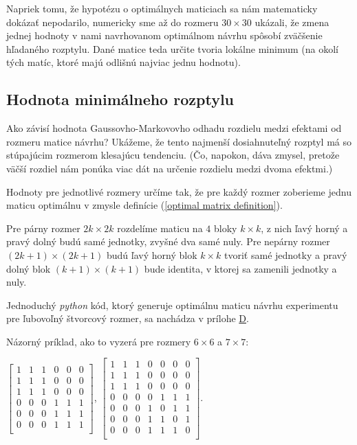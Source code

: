 Napriek tomu, že hypotézu o optimálnych maticiach sa nám matematicky dokázať nepodarilo, numericky sme až do rozmeru $30 \times 30$ ukázali,
že zmena jednej hodnoty v nami navrhovanom optimálnom návrhu spôsobí zväčšenie hľadaného rozptylu.
Dané matice teda určite tvoria lokálne minimum (na okolí tých matíc, ktoré majú odlišnú najviac jednu hodnotu).

\subsection{Hodnota minimálneho rozptylu}

Ako závisí hodnota Gaussovho-Markovovho odhadu rozdielu medzi efektami od rozmeru matice návrhu? 
Ukážeme, že tento najmenší dosiahnuteľný rozptyl má so stúpajúcim rozmerom klesajúcu tendenciu. 
(Čo, napokon, dáva zmysel, pretože väčší rozdiel nám ponúka viac dát na určenie rozdielu medzi dvoma efektmi.)

Hodnoty pre jednotlivé rozmery určíme tak, že pre každý rozmer zoberieme jednu maticu optimálnu 
v zmysle definície (\ref{optimal matrix definition}).

Pre párny rozmer $2k \times 2k$ rozdelíme maticu na $4$ bloky $k \times k$, 
z nich ľavý horný a pravý dolný budú samé jednotky, zvyšné dva samé nuly. 
Pre nepárny rozmer $(2k + 1) \times (2k + 1)$ budú ľavý horný blok $k \times k$ tvoriť samé jednotky 
a pravý dolný blok $(k + 1) \times (k + 1)$ bude identita, v ktorej sa zamenili jednotky a nuly.

Jednoduchý \emph{python} kód, ktorý generuje optimálnu maticu návrhu experimentu pre ľubovoľný štvorcový rozmer,
sa nachádza v prílohe \hyperref[appendix:d]{D}.

Názorný príklad, ako to vyzerá pre rozmery $6 \times 6$ a $7 \times 7$:

\begin{center}
$
\begin{bmatrix}
1 & 1 & 1 & 0 & 0 & 0 \\
1 & 1 & 1 & 0 & 0 & 0 \\
1 & 1 & 1 & 0 & 0 & 0 \\
0 & 0 & 0 & 1 & 1 & 1 \\
0 & 0 & 0 & 1 & 1 & 1 \\
0 & 0 & 0 & 1 & 1 & 1 \\
\end{bmatrix}
$,
$
\begin{bmatrix}
1 & 1 & 1 & 0 & 0 & 0 & 0 \\
1 & 1 & 1 & 0 & 0 & 0 & 0 \\
1 & 1 & 1 & 0 & 0 & 0 & 0 \\
0 & 0 & 0 & 0 & 1 & 1 & 1 \\
0 & 0 & 0 & 1 & 0 & 1 & 1 \\
0 & 0 & 0 & 1 & 1 & 0 & 1 \\
0 & 0 & 0 & 1 & 1 & 1 & 0 \\
\end{bmatrix}
$.
\end{center}

